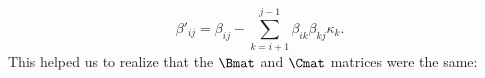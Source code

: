 \begin{equation}
\beta'_{ij} = \beta_{ij} - \sum\limits^{j-1}_{k = i+1} \beta_{i k} \beta_{k j}\kappa_k.
\end{equation}
This helped us to realize that the $\Bmat$ and $\Cmat$ matrices were the same: